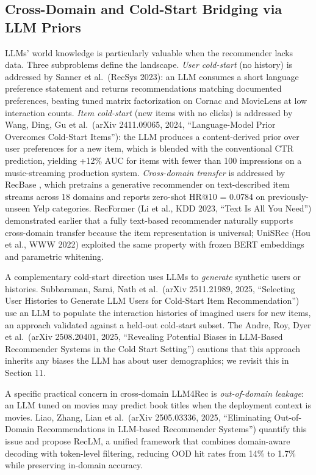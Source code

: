 \documentclass{article}
\begin{document}
\subsection{Cross-Domain and Cold-Start Bridging via LLM Priors}\label{cross-domain-and-cold-start-bridging-via-llm-priors}

LLMs' world knowledge is particularly valuable when the recommender lacks data. Three subproblems define the landscape. \emph{User cold-start} (no history) is addressed by Sanner et al.~(RecSys 2023): an LLM consumes a short language preference statement and returns recommendations matching documented preferences, beating tuned matrix factorization on Cornac and MovieLens at low interaction counts. \emph{Item cold-start} (new items with no clicks) is addressed by Wang, Ding, Gu et al.~(arXiv 2411.09065, 2024, ``Language-Model Prior Overcomes Cold-Start Items''): the LLM produces a content-derived prior over user preferences for a new item, which is blended with the conventional CTR prediction, yielding +12\% AUC for items with fewer than 100 impressions on a music-streaming production system. \emph{Cross-domain transfer} is addressed by RecBase \citep{zhou2025recbasegenerativef}, which pretrains a generative recommender on text-described item streams across 18 domains and reports zero-shot HR@10 = 0.0784 on previously-unseen Yelp categories. RecFormer (Li et al., KDD 2023, ``Text Is All You Need'') demonstrated earlier that a fully text-based recommender naturally supports cross-domain transfer because the item representation is universal; UniSRec (Hou et al., WWW 2022) exploited the same property with frozen BERT embeddings and parametric whitening.

A complementary cold-start direction uses LLMs to \emph{generate} synthetic users or histories. Subbaraman, Sarai, Nath et al.~(arXiv 2511.21989, 2025, ``Selecting User Histories to Generate LLM Users for Cold-Start Item Recommendation'') use an LLM to populate the interaction histories of imagined users for new items, an approach validated against a held-out cold-start subset. The Andre, Roy, Dyer et al.~(arXiv 2508.20401, 2025, ``Revealing Potential Biases in LLM-Based Recommender Systems in the Cold Start Setting'') cautions that this approach inherits any biases the LLM has about user demographics; we revisit this in Section 11.

A specific practical concern in cross-domain LLM4Rec is \emph{out-of-domain leakage}: an LLM tuned on movies may predict book titles when the deployment context is movies. Liao, Zhang, Lian et al.~(arXiv 2505.03336, 2025, ``Eliminating Out-of-Domain Recommendations in LLM-based Recommender Systems'') quantify this issue and propose RecLM, a unified framework that combines domain-aware decoding with token-level filtering, reducing OOD hit rates from 14\% to 1.7\% while preserving in-domain accuracy.
\end{document}
